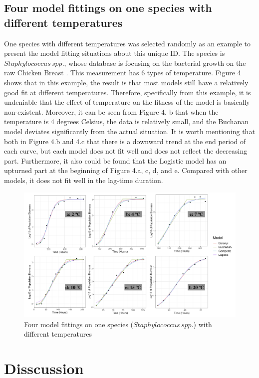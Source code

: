 \documentclass[11pt]{article}
\begin{document}
\subsection{Four model fittings on one species with different temperatures}
One species with different temperatures was selected randomly as an example to present the model fitting situations about this unique ID. The species is $Staphylococcus\,spp.$, whose database is focusing on the bacterial growth on the raw Chicken Breast \citep{R19}. This measurement has 6 types of temperature. Figure 4 shows that in this example, the result is that most models still have a relatively good fit at different temperatures. Therefore, specifically from this example, it is undeniable that the effect of temperature on the fitness of the model is basically non-existent. Moreover, it can be seen from Figure 4. b that when the temperature is 4 degrees Celsius, the data is relatively small, and the Buchanan model deviates significantly from the actual situation. It is worth mentioning that both in Figure 4.b and 4.c that there is a downward trend at the end period of each curve, but each model does not fit well and does not reflect the decreasing part. Furthermore, it also could be found that the Logistic model has an upturned part at the beginning of Figure 4.a, c, d, and e. Compared with other models, it does not fit well in the lag-time duration.
\begin{figure}[h]
\centering
\includegraphics[width = \textwidth]{../Code/Materials/figure4.jpg}
       \caption{Four model fittings on one species ($Staphylococcus\,spp.$) with different temperatures }
	    \end{figure}


\section{Disscussion}
\end{document}
